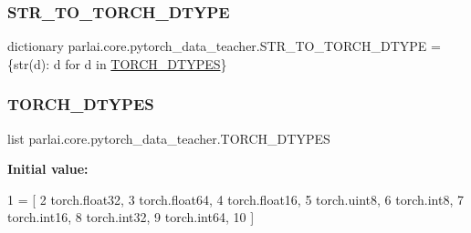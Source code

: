 \subsubsection{\texorpdfstring{S\+T\+R\+\_\+\+T\+O\+\_\+\+T\+O\+R\+C\+H\+\_\+\+D\+T\+Y\+PE}{STR\_TO\_TORCH\_DTYPE}}
{\footnotesize\ttfamily dictionary parlai.\+core.\+pytorch\+\_\+data\+\_\+teacher.\+S\+T\+R\+\_\+\+T\+O\+\_\+\+T\+O\+R\+C\+H\+\_\+\+D\+T\+Y\+PE = \{str(d)\+: d for d in \hyperlink{namespaceparlai_1_1core_1_1pytorch__data__teacher_a70d3594b63522c1d2596bd15f1fb89e0}{T\+O\+R\+C\+H\+\_\+\+D\+T\+Y\+P\+ES}\}}

\mbox{\label{namespaceparlai_1_1core_1_1pytorch__data__teacher_a70d3594b63522c1d2596bd15f1fb89e0}} 
\subsubsection{\texorpdfstring{T\+O\+R\+C\+H\+\_\+\+D\+T\+Y\+P\+ES}{TORCH\_DTYPES}}
{\footnotesize\ttfamily list parlai.\+core.\+pytorch\+\_\+data\+\_\+teacher.\+T\+O\+R\+C\+H\+\_\+\+D\+T\+Y\+P\+ES}

{\bfseries Initial value\+:}
\begin{DoxyCode}
1 =  [
2     torch.float32,
3     torch.float64,
4     torch.float16,
5     torch.uint8,
6     torch.int8,
7     torch.int16,
8     torch.int32,
9     torch.int64,
10 ]
\end{DoxyCode}
